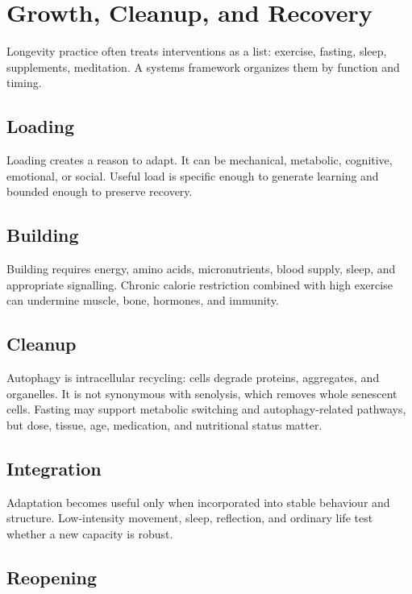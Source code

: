 \chapter{Growth, Cleanup, and Recovery}

Longevity practice often treats interventions as a list: exercise, fasting, sleep, supplements, meditation. A systems framework organizes them by function and timing.

\section{Loading}

Loading creates a reason to adapt. It can be mechanical, metabolic, cognitive, emotional, or social. Useful load is specific enough to generate learning and bounded enough to preserve recovery.

\section{Building}

Building requires energy, amino acids, micronutrients, blood supply, sleep, and appropriate signalling. Chronic calorie restriction combined with high exercise can undermine muscle, bone, hormones, and immunity.

\section{Cleanup}

Autophagy is intracellular recycling: cells degrade proteins, aggregates, and organelles. It is not synonymous with senolysis, which removes whole senescent cells. Fasting may support metabolic switching and autophagy-related pathways, but dose, tissue, age, medication, and nutritional status matter.

\section{Integration}

Adaptation becomes useful only when incorporated into stable behaviour and structure. Low-intensity movement, sleep, reflection, and ordinary life test whether a new capacity is robust.

\section{Reopening}

